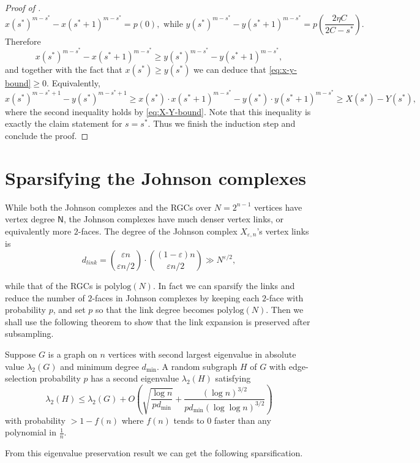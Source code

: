 \begin{proof}[Proof of ]
     \[x(s^*)^{m-s^*} - x(s^*+1)^{m-s^*} = p(0),\text{ while }y(s^*)^{m-s^*} - y(s^*+1)^{m-s^*} = p\left(\frac{2\eta C}{2C - s^*}\right).\]
     Therefore
     \[x(s^*)^{m-s^*} - x(s^*+1)^{m-s^*} \ge y(s^*)^{m-s^*} - y(s^*+1)^{m-s^*},\]
     and together with the fact  that $x(s^*) \ge y(s^*)$ we can deduce that \eqref{eq:x-y-bound}$\ge 0$. Equivalently,
     \[ x(s^*)^{m-s^*+1} - y(s^*)^{m-s^*+1} \ge x(s^*) \cdot x(s^*+1)^{m-s^*} -  y(s^*) \cdot y(s^*+1)^{m-s^*} \ge X(s^*) - Y(s^*),  \]
     where the second inequality holds by \eqref{eq:X-Y-bound}. Note that this inequality is exactly the claim  statement for $s = s^*$. Thus we finish the induction step and conclude the proof.
\end{proof}

\section{Sparsifying the Johnson complexes}
\label{app:sparsify-JC}

While both the Johnson complexes and the RGCs over $N = 2^{n-1}$ vertices have vertex degree $\mathsf{N}$, the Johnson complexes have much denser vertex links, or equivalently more $2$-faces. The degree of the Johnson complex $X_{\varepsilon,n}$'s vertex links is 
\[d_{link} = {\binom{\varepsilon n}{\varepsilon n/2}}\cdot {\binom{(1-\varepsilon) n}{\varepsilon n/2}} \gg N^{\varepsilon/2} 
,\]

while that of the RGCs is $\mathrm{polylog}(N)$. In fact we can sparsify the links and reduce the number of $2$-faces in Johnson complexes by keeping each $2$-face with probability $p$, and set $p$ so that the link degree becomes $\mathrm{polylog}(N)$. Then we shall use the following theorem to show that the link expansion is preserved after subsampling.  

\begin{theorem}
    Suppose $G$ is a graph on $n$ vertices with second largest eigenvalue in absolute value $\lambda_2(G)$ and minimum degree $d_{\min}$. A random subgraph $H$ of $G$ with edge-selection probability $p$ has a second eigenvalue $\lambda_2(H)$ satisfying
 \[ \lambda_2(H) \le \lambda_2(G) + O\left( \sqrt{\frac{\log n}{pd_{\min}}} + \frac{(\log n)^{3/2}}{pd_{\min} (\log\log n)^{3/2}}\right)\]
 with probability $>1 - f(n)$ where \(f(n)\) tends to \(0\) faster than any polynomial in $\frac{1}{n}$.
\end{theorem}
From this eigenvalue preservation result we can get the following sparsification.


